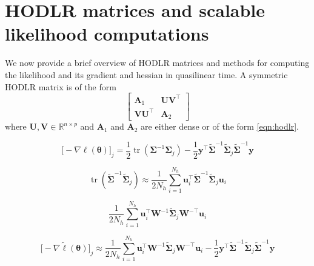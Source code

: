 \documentclass{article}
\newcommand{\mat}[1]{\begin{bmatrix}#1\end{bmatrix}}
\newcommand{\R}{\mathbb{R}}
\DeclareMathOperator{\tr}{tr}
\numberwithin{equation}{section}
\newcommand{\cm}{\bm{\Sigma}}
\newcommand{\acm}{\widetilde{\cm}}
\newcommand{\y}{\bm{y}}
\renewcommand{\u}{\bm{u}}
\newcommand{\A}{\bm{A}}
\newcommand{\U}{\bm{U}}
\newcommand{\V}{\bm{V}}
\newcommand{\W}{\bm{W}}
\begin{document}

\section{HODLR matrices and scalable likelihood computations} \label{sec:hodlr}
We now provide a brief overview of HODLR matrices and methods for computing the likelihood and its gradient and hessian in quasilinear time. A symmetric HODLR matrix is of the form
\begin{equation}
  \mat{\A_1 & \U \V^\top \\ \V \U^\top & \A_2}
  \label{eqn:hodlr}
\end{equation}
where $\U, \V \in \R^{n \times p}$ and $\A_1$ and $\A_2$ are either dense or of the form \ref{eqn:hodlr}.

\begin{equation}
  \big[-\nabla \ell(\bm{\theta}) \big]_j = \frac{1}{2} \tr(\cm^{-1} \cm_j) - \frac{1}{2} \y^\top \acm^{-1} \acm_j \acm^{-1} \y
  \label{eqn:grad}
\end{equation}

\begin{equation}
  \tr(\acm^{-1} \acm_j) \approx \frac{1}{2N_h} \sum_{i=1}^{N_h} \u_i^\top \acm^{-1} \acm_j \u_i
  \label{eqn:hutch}
\end{equation}

\begin{equation}
  \frac{1}{2N_h} \sum_{i=1}^{N_h} \u_i^\top \W^{-1} \acm_j \W^{-\top} \u_i
  \label{eqn:symhutch}
\end{equation}

\begin{equation}
  \big[-\nabla \tilde{\ell}(\bm{\theta}) \big]_j \approx \frac{1}{2N_h} \sum_{i=1}^{N_h} \u_i^\top \W^{-1} \acm_j \W^{-\top} \u_i - \frac{1}{2} \y^\top \acm^{-1} \acm_j \acm^{-1} \y
  \label{eqn:approxgrad}
\end{equation}
\end{document}
